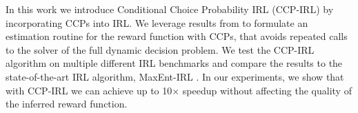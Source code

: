 \documentclass{article}
\begin{document}

In this work we introduce Conditional Choice Probability IRL (CCP-IRL) by incorporating CCPs into IRL. We leverage results from \cite{rust_gmc, hotz, magnac} to formulate an estimation routine for the reward function with CCPs, that avoids repeated calls to the solver of the full dynamic decision problem. We test the CCP-IRL algorithm on multiple different IRL benchmarks and compare the results to the state-of-the-art IRL algorithm, MaxEnt-IRL \cite{ziebart}. In our experiments, we show that with CCP-IRL we can achieve up to 10$\times$ speedup without affecting the quality of the inferred reward function. 

\end{document}
